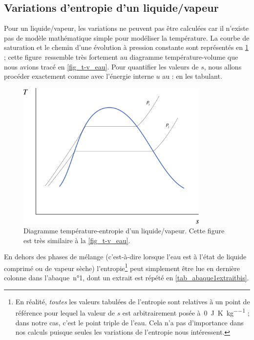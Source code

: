 	\subsection{Variations d’entropie d’un liquide/vapeur}
	
		Pour un liquide/vapeur, les variations ne peuvent pas être calculées car il n’existe pas de modèle mathématique simple pour modéliser la température. La courbe de saturation et le chemin d’une évolution à pression constante sont représentés en \cref{fig_ts_lv} ; cette figure~ressemble très fortement au diagramme température-volume que nous avions tracé en \cref{fig_t-v_eau}.
		Pour quantifier les valeurs de $s$, nous allons procéder exactement comme avec l’énergie interne $u$ au \courscinq : en les tabulant.

		\begin{figure}
			\begin{center}
				\includegraphics[width=9.5cm]{images/ts_lv.png}
			\end{center}
			\caption{Diagramme température-entropie d’un liquide/vapeur. Cette figure est très similaire à la \cref{fig_t-v_eau}.}
			\label{fig_ts_lv}
		\end{figure}
		
		En dehors des phases de mélange (c’est-à-dire lorsque l’eau est à l’état de liquide comprimé ou de vapeur sèche) l’entropie\footnote{En réalité, \emph{toutes} les valeurs tabulées de l’entropie sont relatives à un point de référence pour lequel la valeur de $s$ est arbitrairement posée à~\SI{0}{\joule\per\kelvin\per\kilogram} ; dans notre cas, c’est le point triple de l’eau. Cela n’a pas d’importance dans nos calculs puisque seules les variations de l’entropie nous intéressent.} peut simplement être lue en dernière colonne dans l’abaque~n°1, dont un extrait est répété en \cref{tab_abaque1extraitbis}.
		
